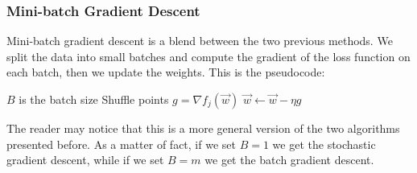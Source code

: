 \subsubsection*{Mini-batch Gradient Descent}\label{sec:minibatch-gradient-descent}
Mini-batch gradient descent is a blend between the two previous methods.
We split the data into small batches and compute the gradient of the loss function on each batch, then we
update the weights.
This is the pseudocode:

\begin{algorithmic}[1]\label{alg:minibatch-gradient-descent}
  \State $B$ is the batch size
    \State Shuffle points
        \State \( g = \nabla f_j(\vec{w}) \)
        \State \( \vec{w} \gets \vec w - \eta g \)
      \EndFor
    \EndFor
  \EndWhile
\end{algorithmic}

The reader may notice that this is a more general version of the two algorithms presented before.
As a matter of fact, if we set $B = 1$ we get the stochastic gradient descent, 
while if we set $B = m$ we get the batch gradient descent.
